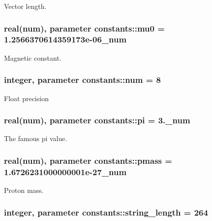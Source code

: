 Vector length. 

\subsubsection[{\texorpdfstring{mu0}{mu0}}]{\setlength{\rightskip}{0pt plus 5cm}real({\bf num}), parameter constants\+::mu0 = 1.\+2566370614359173e-\/06\+\_\+num}\hypertarget{namespaceconstants_adf2453bfeefbefa1135a81f4ddfe4d6d}{}\label{namespaceconstants_adf2453bfeefbefa1135a81f4ddfe4d6d}


Magnetic constant. 

\subsubsection[{\texorpdfstring{num}{num}}]{\setlength{\rightskip}{0pt plus 5cm}integer, parameter constants\+::num = 8}\hypertarget{namespaceconstants_afe19f7f8af171411c51fb763b36e3823}{}\label{namespaceconstants_afe19f7f8af171411c51fb763b36e3823}


Float precision 

\subsubsection[{\texorpdfstring{pi}{pi}}]{\setlength{\rightskip}{0pt plus 5cm}real({\bf num}), parameter constants\+::pi = 3.\+\_\+num}\hypertarget{namespaceconstants_a736c2860cb0585043ad4abcd1c3352b1}{}\label{namespaceconstants_a736c2860cb0585043ad4abcd1c3352b1}


The famous pi value. 

\subsubsection[{\texorpdfstring{pmass}{pmass}}]{\setlength{\rightskip}{0pt plus 5cm}real({\bf num}), parameter constants\+::pmass = 1.\+6726231000000001e-\/27\+\_\+num}\hypertarget{namespaceconstants_a44f3d8cbf9c39db63d7533d985cc51c3}{}\label{namespaceconstants_a44f3d8cbf9c39db63d7533d985cc51c3}


Proton mass. 

\subsubsection[{\texorpdfstring{string\+\_\+length}{string_length}}]{\setlength{\rightskip}{0pt plus 5cm}integer, parameter constants\+::string\+\_\+length = 264}\hypertarget{namespaceconstants_a6082bfa433cfb27d3f80d0f32b278570}{}\label{namespaceconstants_a6082bfa433cfb27d3f80d0f32b278570}
